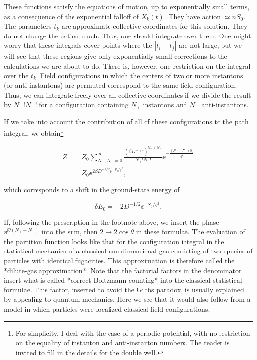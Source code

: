 These functions satisfy the equations of motion, up to exponentially small
terms, as a consequence of the exponential falloff of $X_k(t)$. They have action
$\simeq nS_0$. The parameters $t_k$ are approximate collective coordinates for
this solution. They do not change the action much. Thus, one should integrate
over them. One might worry that these integrals cover points where the
$|t_i-t_j|$ are not large, but we will see that these regions give only
exponentially small corrections to the calculations we are about to do. There
is, however, one restriction on the integral over the $t_k$. Field
configurations in which the centers of two or more instantons (or
anti-instantons) are permuted correspond to the same field configuration. Thus,
we can integrate freely over all collective coordinates if we divide the result
by $N_+!N_-!$ for a configuration containing $N_+$ instantons and $N_-$
anti-instantons.

If we take into account the contribution of all of these configurations to the
path integral, we obtain\footnote[3]{For simplicity, I deal with the case of a
periodic potential, with no restriction on the equality of instanton and
anti-instanton numbers. The reader is invited to fill in the details for the
double well.}

\[
\begin{aligned}
  Z&=Z_0\sum_{N_+,N_-=0}^{\infty}
  \frac{(\beta D^{-1/2})^{N_++N_-}}{N_+!N_-!}
  \ee^{-\frac{(N_++N_-)S_0}{g^2}}\\
  &=Z_0\ee^{2\beta D^{-1/2}\ee^{-S_0/g^2}},
\end{aligned}
\]

which corresponds to a shift in the ground-state energy of

\[
  \delta E_0=-2D^{-1/2}\ee^{-S_0/g^2}.
\]

If, following the prescription in the footnote above, we insert the phase
$\ee^{\ii\theta(N_+-N_-)}$ into the sum, then $2\to2\cos\theta$ in these
formulae. The evaluation of the partition function looks like that for the
configuration integral in the statistical mechanics of a classical
one-dimensional gas consisting of two species of particles with identical
fugacities. This approximation is therefore called the *dilute-gas
approximation*. Note that the factorial factors in the denominator insert what
is called *correct Boltzmann counting* into the classical statistical formulae.
This factor, inserted to avoid the Gibbs paradox, is usually explained by
appealing to quantum mechanics. Here we see that it would also follow from a
model in which particles were localized classical field configurations.

